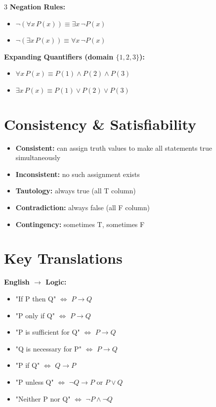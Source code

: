 \documentclass[8pt]{article}
\theoremstyle{definition}
\begin{document}
\begin{multicols}{3}
\textbf{Negation Rules:}
\begin{itemize}[nosep]
\item $\neg(\forall x\, P(x)) \equiv \exists x\, \neg P(x)$
\item $\neg(\exists x\, P(x)) \equiv \forall x\, \neg P(x)$
\end{itemize}
\textbf{Expanding Quantifiers (domain $\{1,2,3\}$):}
\begin{itemize}[nosep]
\item $\forall x\, P(x) \equiv P(1) \land P(2) \land P(3)$
\item $\exists x\, P(x) \equiv P(1) \lor P(2) \lor P(3)$
\end{itemize}

\section*{Consistency \& Satisfiability}
\begin{itemize}[nosep]
\item \textbf{Consistent:} can assign truth values to make all statements true simultaneously
\item \textbf{Inconsistent:} no such assignment exists
\item \textbf{Tautology:} always true (all T column)
\item \textbf{Contradiction:} always false (all F column)
\item \textbf{Contingency:} sometimes T, sometimes F
\end{itemize}

\section*{Key Translations}
\textbf{English $\to$ Logic:}
\begin{itemize}[nosep]
\item "If P then Q" $\iff$ $P \to Q$
\item "P only if Q" $\iff$ $P \to Q$
\item "P is sufficient for Q" $\iff$ $P \to Q$
\item "Q is necessary for P" $\iff$ $P \to Q$
\item "P if Q" $\iff$ $Q \to P$
\item "P unless Q" $\iff$ $\neg Q \to P$ or $P \lor Q$
\item "Neither P nor Q" $\iff$ $\neg P \land \neg Q$

\end{itemize}


\end{multicols}
\end{document}
